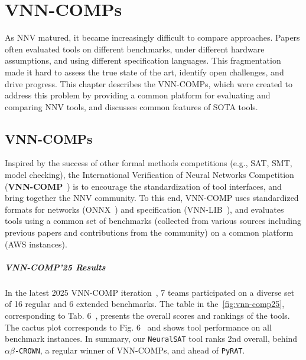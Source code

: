 \documentclass[oneside,11pt,dvipsnames]{book}
\numberwithin{equation}{section}
\theoremstyle{definition}
\theoremstyle{remark}
\newcommand{\crown}{\texttt{$\alpha\beta$-CROWN}}
\newcommand{\neuralsat}{\texttt{NeuralSAT}}
\begin{document}
\chapter{VNN-COMPs}\label{chap:vnncomps}


As NNV matured, it became increasingly difficult to compare approaches. Papers often evaluated tools on different benchmarks, under different hardware assumptions, and using different specification languages. This fragmentation made it hard to assess the true state of the art, identify open challenges, and drive progress. This chapter describes the VNN-COMPs, which were created to address this problem by providing a common platform for evaluating and comparing NNV tools, and discusses common features of SOTA tools.


\section{VNN-COMPs}
Inspired by the success of other formal methods competitions (e.g., SAT, SMT, model checking), the International Verification of Neural Networks Competition (\textbf{VNN-COMP}~\cite{kaulen20256thinternationalverificationneural,brix2024fifth,brix2023fourth}) is to encourage the standardization of tool interfaces, and bring together the NNV community.
To this end, VNN-COMP uses standardized formats for networks (ONNX~\cite{onnx}) and specification (VNN-LIB~\cite{vnnlib}), and evaluates tools 
using a common set of benchmarks (collected from various sources including previous papers and contributions from the community) on a common platform (AWS instances).



\paragraph{VNN-COMP'25 Results} In the latest 2025 VNN-COMP iteration~\cite{kaulen20256thinternationalverificationneural}, 7 teams participated on a diverse set of 16 regular and 6 extended benchmarks. 
The table in the~\autoref{fig:vnn-comp25}, corresponding to Tab. 6~\cite{kaulen20256thinternationalverificationneural},  presents the overall scores and rankings of the tools. 
The cactus plot corresponds to Fig. 6~\cite{kaulen20256thinternationalverificationneural} and shows tool performance on all benchmark instances. 
In summary, our \neuralsat{} tool ranks 2nd overall, behind \crown{}, a regular winner of VNN-COMPs, and ahead of \texttt{PyRAT}.
\end{document}
